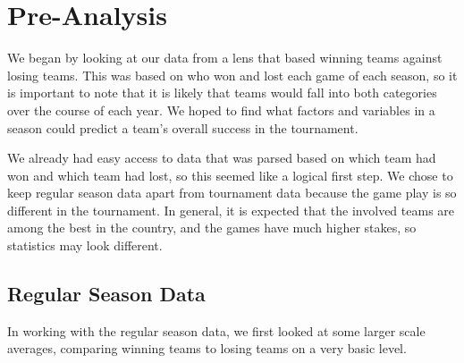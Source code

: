 \documentclass[]{scrartcl}
\begin{document}
\section*{Pre-Analysis}
We began by looking at our data from a lens that based winning teams against losing teams. This was based on who won and lost each game of each season, so it is important to note that it is likely that teams would fall into both categories over the course of each year. We hoped to find what factors and variables in a season could predict a team's overall success in the tournament.

We already had easy access to data that was parsed based on which team had won and which team had lost, so this seemed like a logical first step. We chose to keep regular season data apart from tournament data because the game play is so different in the tournament. In general, it is expected that the involved teams are among the best in the country, and the games have much higher stakes, so statistics may look different.
\subsection*{Regular Season Data}
In working with the regular season data, we first looked at some larger scale averages, comparing winning teams to losing teams on a very basic level.
\end{document}
